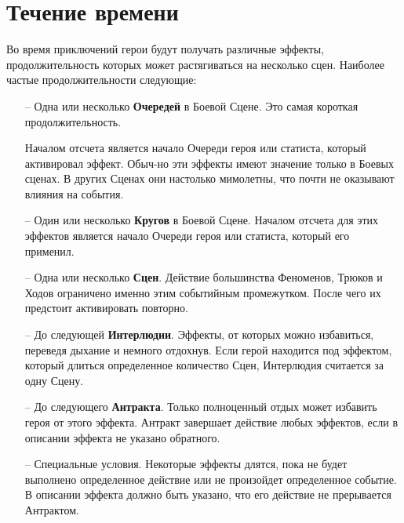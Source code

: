 \section{Течение времени}
Во время приключений герои будут получать различные эффекты, продолжительность которых может растягиваться на несколько сцен. Наиболее частые продолжительности следующие:
\begin{itemize}
\item[--] Одна или несколько \textbf{Очередей} в Боевой Сцене. Это самая короткая продолжительность.
\begin{tcolorbox}
Началом отсчета является начало Очереди героя или статиста, который активировал эффект. Обыч-но эти эффекты имеют значение только в Боевых сценах. В других Сценах они настолько мимолетны, что почти не оказывают влияния на события.
\end{tcolorbox}
\item[--] Один или несколько \textbf{Кругов} в Боевой Сцене. Началом отсчета для этих эффектов является начало Очереди героя или статиста, который его применил.
\item[--] Одна или несколько \textbf{Сцен}. Действие большинства Феноменов, Трюков и Ходов ограничено именно этим событийным промежутком. После чего их предстоит активировать повторно.
\item[--] До следующей \textbf{Интерлюдии}. Эффекты, от которых можно избавиться, переведя дыхание и немного отдохнув. Если герой находится под эффектом, который длиться определенное количество Сцен, Интерлюдия считается за одну Сцену.
\item[--] До следующего \textbf{Антракта}. Только полноценный отдых может избавить героя от этого эффекта. Антракт завершает действие любых эффектов, если в описании эффекта не указано обратного.
\item[--] Специальные условия. Некоторые эффекты длятся, пока не будет выполнено определенное действие или не произойдет определенное событие. В описании эффекта должно быть указано, что его действие не прерывается Антрактом.
\end{itemize}
